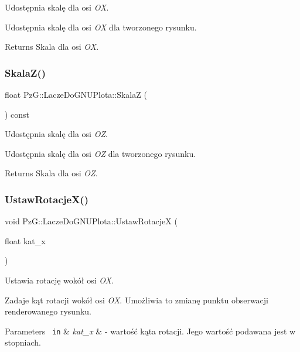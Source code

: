 Udostępnia skalę dla osi {\itshape OX}. 

Udostępnia skalę dla osi {\itshape OX} dla tworzonego rysunku. \begin{DoxyReturn}{Returns}
Skala dla osi {\itshape OX}. 
\end{DoxyReturn}
\mbox{\label{class_pz_g_1_1_lacze_do_g_n_u_plota_a44f922ccbc508d6cd7809c669238dae3}} 
\subsubsection{\texorpdfstring{SkalaZ()}{SkalaZ()}}
{\footnotesize\ttfamily float Pz\+G\+::\+Lacze\+Do\+G\+N\+U\+Plota\+::\+SkalaZ (\begin{DoxyParamCaption}{ }\end{DoxyParamCaption}) const\hspace{0.3cm}{\ttfamily [inline]}}



Udostępnia skalę dla osi {\itshape OZ}. 

Udostępnia skalę dla osi {\itshape OZ} dla tworzonego rysunku. \begin{DoxyReturn}{Returns}
Skala dla osi {\itshape OZ}. 
\end{DoxyReturn}
\mbox{\label{class_pz_g_1_1_lacze_do_g_n_u_plota_a88324c53a70846fb6bc9d918ce21fd56}} 
\subsubsection{\texorpdfstring{UstawRotacjeX()}{UstawRotacjeX()}}
{\footnotesize\ttfamily void Pz\+G\+::\+Lacze\+Do\+G\+N\+U\+Plota\+::\+Ustaw\+RotacjeX (\begin{DoxyParamCaption}\item[{float}]{kat\+\_\+x }\end{DoxyParamCaption})\hspace{0.3cm}{\ttfamily [inline]}}



Ustawia rotację wokół osi {\itshape OX}. 

Zadaje kąt rotacji wokół osi {\itshape OX}. Umożliwia to zmianę punktu obserwacji renderowanego rysunku. 
\begin{DoxyParams}[1]{Parameters}
\mbox{\texttt{ in}}  & {\em kat\+\_\+x} & -\/ wartość kąta rotacji. Jego wartość podawana jest w stopniach. \\
\hline
\end{DoxyParams}
\mbox{\label{class_pz_g_1_1_lacze_do_g_n_u_plota_a94d8527fd78048ed6cb32ffb29e5f903}} 
